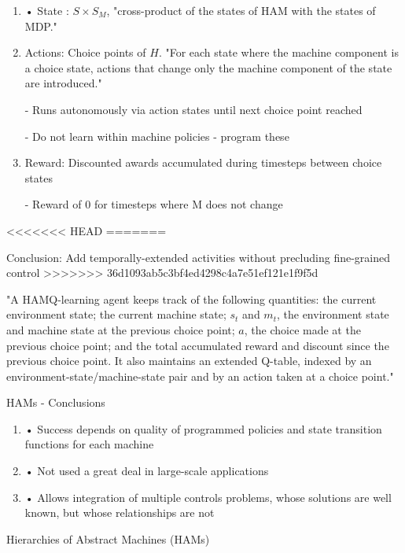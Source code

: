 \documentclass[english]{article}
\begin{document}
\begin{enumerate}
\item 
• State : $S \times S_M$, "cross-product of the states of HAM with the states of MDP."

\item  Actions: Choice points of $H$. "For each state where the machine component is a choice state,
actions that change only the machine component of the state are introduced."

- Runs autonomously via action states until next choice point reached

- Do not learn within machine policies - program these

\item  Reward: Discounted awards accumulated during timesteps
between choice states

- Reward of 0 for timesteps where M does not change
\end{enumerate}

<<<<<<< HEAD
=======
\item  Conclusion: Add temporally-extended activities without
precluding fine-grained control
>>>>>>> 36d1093ab5c3bf4ed4298c4a7e51ef121e1f9f5d

"A HAMQ-learning agent keeps track of the following quantities:  the current environment
state; the current machine state; $s_t$ and $m_t$, the environment state and machine state at
the previous choice point; $a$, the choice made at the previous choice point; and the total accumulated reward and discount since the previous choice point. It also maintains
an extended Q-table, indexed by an environment-state/machine-state
pair and by an action taken at a choice point."

\item 
HAMs - Conclusions


\begin{enumerate}
\item 
• Success depends on quality of programmed policies and
state transition functions for each machine

\item • Not used a great deal in large-scale applications


\item  • Allows integration of multiple controls problems, whose
solutions are well known, but whose relationships are not
\end{enumerate}

\item Hierarchies of Abstract Machines (HAMs)
\end{document}
